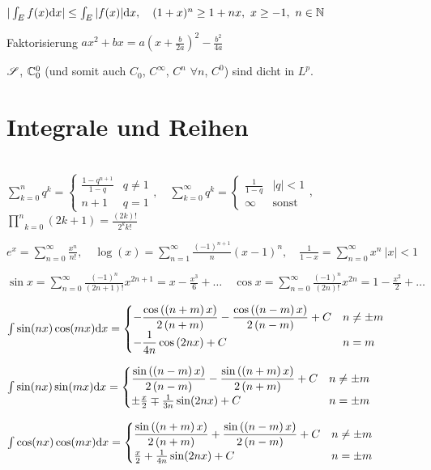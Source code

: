 $|\int_Ef(x)\mathrm{d}x|\leq\int_E|f(x)|\mathrm{d}x, \quad (1+x)^n \geq 1+nx,\ x\geq-1,\ n\in\mathbb{N}$

Faktorisierung $ax^2+bx = a(x+\frac{b}{2a})^2-\frac{b^2}{4a}$

$\mathscr{S}$, $\mathbb{C}_0^0$ (und somit auch $C_0$, $C^{\infty}$, $C^n$ $\forall n$, $C^0$) sind dicht in $L^p$.


\section{Integrale und Reihen}
\hspace*{\fill} \\
$\sum_{k=0}^n q^k = \begin{cases}
  \frac{1-q^{n+1}}{1-q} & q\neq1 \\
  n+1 & q=1
\end{cases}, \quad \sum_{k=0}^{\infty} q^k = \begin{cases}
  \frac{1}{1-q} & |q|<1 \\
  \infty & \text{sonst}
\end{cases}$,
\quad $\underset{k = 0}{\overset{n}{\prod}}(2k + 1) = \frac{(2k)!}{2^kk!}$

$e^x = \sum_{n=0}^{\infty}\frac{x^n}{n!},\quad \log(x) = \sum_{n=1}^{\infty}\frac{(-1)^{n+1}}{n}(x-1)^n,\quad \frac1{1-x}=\sum_{n=0}^{\infty}x^n \ |x|<1$

$\sin x = \sum_{n=0}^{\infty} \frac{(-1)^n}{(2n+1)!}x^{2n+1} = x-\frac{x^3}{6}+\ldots \quad \cos x = \sum_{n=0}^{\infty} \frac{(-1)^n}{(2n)!}x^{2n} = 1-\frac{x^2}{2}+\ldots$


$\int \sin(nx)\cos(mx)\mathrm{d}x = \begin{cases}
  -\dfrac{\cos\left(\left(n+m\right)x\right)}{2\left(n+m\right)}-\dfrac{\cos\left(\left(n-m\right)x\right)}{2\left(n-m\right)} + C & n\neq\pm m\\
  -\dfrac1{4n} \cos\left(2nx\right) + C & n=m
\end{cases}$

$\int \sin(nx)\sin(mx)\mathrm{d}x = \begin{cases}
  \dfrac{\sin\left(\left(n-m\right)x\right)}{2\left(n-m\right)}-\dfrac{\sin\left(\left(n+m\right)x\right)}{2\left(n+m\right)} + C & n\neq\pm m \\
  \pm\frac{x}2\mp\frac1{3n}\sin(2nx) + C & n=\pm m
\end{cases}$ 

$\int \cos(nx)\cos(mx)\mathrm{d}x = \begin{cases}
  \dfrac{\sin\left(\left(n+m\right)x\right)}{2\left(n+m\right)}+\dfrac{\sin\left(\left(n-m\right)x\right)}{2\left(n-m\right)} + C & n\neq\pm m \\
  \frac{x}2+\frac1{4n}\sin(2nx) + C & n=\pm m
\end{cases}$

